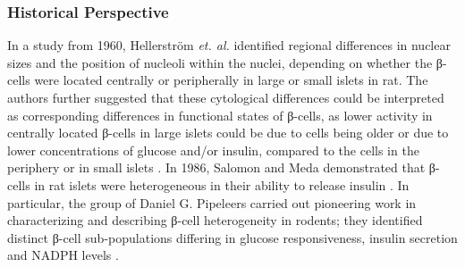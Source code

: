 \subsubsection{Historical Perspective}
In a study from 1960, Hellerström \textit{et. al.} identified regional differences in nuclear sizes and the position of nucleoli within the nuclei, depending on whether the β-cells were located centrally or peripherally in large or small islets in rat. The authors further suggested that these cytological differences could be interpreted as corresponding differences in functional states of β-cells, as lower activity in centrally located β-cells in large islets could be due to cells being older or due to lower concentrations of glucose and/or insulin, compared to the cells in the periphery or in small islets \textbf{\cite{hellerstrom_properties_1960}}. In 1986, Salomon and Meda demonstrated that β-cells in rat islets were heterogeneous in their ability to release insulin \textbf{\cite{salomon_heterogeneity_1986}}. In particular, the group of Daniel G. Pipeleers carried out pioneering work in characterizing and describing β-cell heterogeneity in rodents; they identified distinct β-cell sub-populations differing in glucose responsiveness, insulin secretion and NADPH levels \textbf{\cite{kiekens_differences_1992,schuit_glucose_1988,van_de_winkel_autofluorescence-activated_1983}}.

